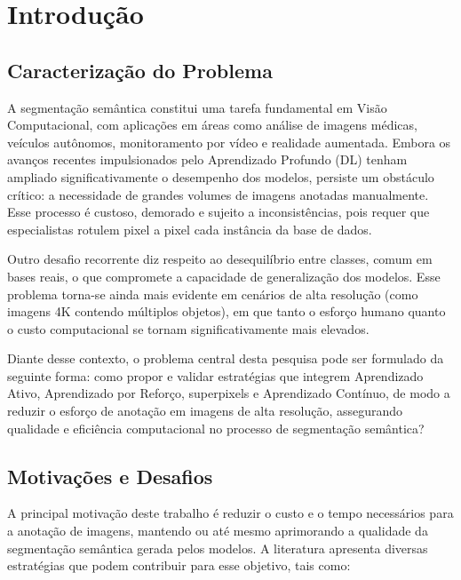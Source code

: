 \chapter[Introdução]{Introdução}
\label{cap_1}
\section{Caracterização do Problema}

A segmentação semântica constitui uma tarefa fundamental em Visão Computacional, com aplicações em áreas como análise de imagens médicas, veículos autônomos, monitoramento por vídeo e realidade aumentada. Embora os avanços recentes impulsionados pelo Aprendizado Profundo (\ac{DL}) tenham ampliado significativamente o desempenho dos modelos, persiste um obstáculo crítico: a necessidade de grandes volumes de imagens anotadas manualmente. Esse processo é custoso, demorado e sujeito a inconsistências, pois requer que especialistas rotulem pixel a pixel cada instância da base de dados.

Outro desafio recorrente diz respeito ao desequilíbrio entre classes, comum em bases reais, o que compromete a capacidade de generalização dos modelos. Esse problema torna-se ainda mais evidente em cenários de alta resolução (como imagens 4K contendo múltiplos objetos), em que tanto o esforço humano quanto o custo computacional se tornam significativamente mais elevados.

Diante desse contexto, o problema central desta pesquisa pode ser formulado da seguinte forma: como propor e validar estratégias que integrem Aprendizado Ativo, Aprendizado por Reforço, superpixels e Aprendizado Contínuo, de modo a reduzir o esforço de anotação em imagens de alta resolução, assegurando qualidade e eficiência computacional no processo de segmentação semântica?

\section{Motivações e Desafios}

A principal motivação deste trabalho é reduzir o custo e o tempo necessários para a anotação de imagens, mantendo ou até mesmo aprimorando a qualidade da segmentação semântica gerada pelos modelos. A literatura apresenta diversas estratégias que podem contribuir para esse objetivo, tais como:

